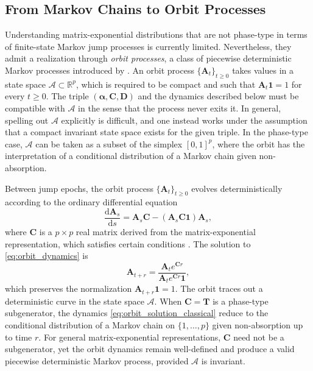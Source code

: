 \documentclass[a4paper,11pt]{article}
\numberwithin{equation}{section}
\theoremstyle{plain}
\theoremstyle{definition}
\newcommand{\1}{\mathbf{1}}
\newcommand{\dd}{\mathrm{d}}
\begin{document}
\subsection{From Markov Chains to Orbit Processes}\label{subsec:from_markov_to_orbits}

Understanding matrix-exponential distributions that are not phase-type in terms of finite-state Markov jump processes is currently limited. 
Nevertheless, they admit a realization through \emph{orbit processes}, a class of piecewise deterministic Markov processes introduced by \cite{AsmussenBladt1999}. An orbit process $\{\bm{A}_t\}_{t \ge 0}$ takes values in a state space $\mathcal{A} \subset \mathbb{R}^p$, which is required to be compact and such that $\bm{A}_{t}\bm{1} = 1$ for every $t\geq 0$. The triple $(\bm{\alpha}, \bm{C}, \bm{D})$ and the dynamics described below must be compatible with $\mathcal{A}$ in the sense that the process never exits it. In general, spelling out $\mathcal{A}$ explicitly is difficult, and one instead works under the assumption that a compact invariant state space exists for the given triple. In the phase-type case, $\mathcal{A}$ can be taken as a subset of the simplex $[0,1]^p$, where the orbit has the interpretation of a conditional distribution of a Markov chain given non-absorption.

Between jump epochs, the orbit process $\{\bm{A}_t\}_{t \ge 0}$ evolves deterministically according to the ordinary differential equation
\begin{equation}\label{eq:orbit_dynamics}
\frac{\dd \bm{A}_s}{\dd s} = \bm{A}_s \bm{C} - (\bm{A}_s \bm{C} \bm{1}) \bm{A}_s,
\end{equation}
where $\bm{C}$ is a $p \times p$ real matrix derived from the matrix-exponential representation, which satisfies certain conditions \cite{AsmussenBladt1999}. 
The solution to \eqref{eq:orbit_dynamics} is
\begin{equation}\label{eq:orbit_solution_classical}
\bm{A}_{t+r} = \frac{\bm{A}_t e^{\bm{C}r}}{\bm{A}_t e^{\bm{C}r} \bm{1}},
\end{equation}
which preserves the normalization $\bm{A}_{t+r}\bm{1} = 1$. The orbit traces out a deterministic curve in the state space $\mathcal{A}$. When $\bm{C} = \bm{T}$ is a phase-type subgenerator, the dynamics \eqref{eq:orbit_solution_classical} reduce to the conditional distribution of a Markov chain on $\{1, \ldots, p\}$ given non-absorption up to time $r$. 
For general matrix-exponential representations, $\bm{C}$ need not be a subgenerator, yet the orbit dynamics remain well-defined and produce a valid piecewise deterministic Markov process, provided $\mathcal{A}$ is invariant.
\end{document}
